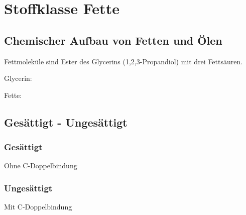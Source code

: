 \section{Stoffklasse Fette}

\subsection{Chemischer Aufbau von Fetten und Ölen}
Fettmoleküle sind Ester des Glycerins (1,2,3-Propandiol) mit drei Fettsäuren.

Glycerin:\\

Fette:\\

\subsection{Gesättigt - Ungesättigt}
\subsubsection{Gesättigt}
Ohne C-Doppelbindung
\subsubsection{Ungesättigt}
Mit C-Doppelbindung
